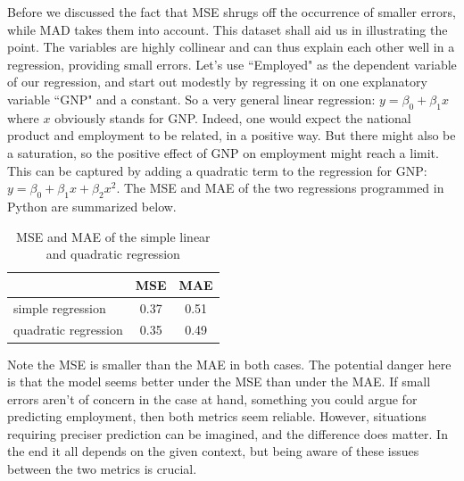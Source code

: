\documentclass{llncs}
\begin{document}

Before we discussed the fact that MSE shrugs off the occurrence of smaller errors, while MAD takes them into account. This dataset shall aid us in illustrating the point. The variables are highly collinear and can thus explain each other well in a regression, providing small errors. Let's use ``Employed" as the dependent variable of our regression, and start out modestly by regressing it on one explanatory variable ``GNP" and a constant. So a very general linear regression: $\displaystyle y = \beta_{0} + \beta_{1}x$ where $x$ obviously stands for GNP. Indeed, one would expect the national product and employment to be related, in a positive way. But there might also be a saturation, so the positive effect of GNP on employment might reach a limit. This can be captured by adding a quadratic term to the regression for GNP: $\displaystyle y = \beta_{0} + \beta_{1}x +\beta_{2}x^{2}$. The MSE and MAE of the two regressions programmed in Python are summarized below.

\begin{table}[H]
    \centering
    \begin{tabular}{l | c | c}
        & MSE & MAE\\ \hline
        simple regression & 0.37& 0.51 \\
        quadratic regression & 0.35 & 0.49
    \end{tabular}
    \caption{MSE and MAE of the simple linear and quadratic regression}
    \label{table:MSE_vs_MAE}
\end{table}
\noindent Note the MSE is smaller than the MAE in both cases. The potential danger here is that the model seems better under the MSE than under the MAE. If small errors aren't of concern in the case at hand, something you could argue for predicting employment, then both metrics seem reliable. However, situations requiring preciser prediction can be imagined, and the difference does matter. In the end it all depends on the given context, but being aware of these issues between the two metrics is crucial.
\end{document}
